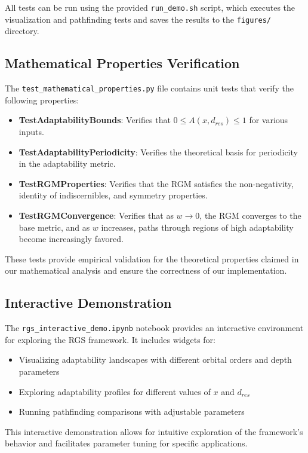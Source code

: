 \documentclass{article}
\begin{document}
All tests can be run using the provided \texttt{run\_demo.sh} script, which executes the visualization and pathfinding tests and saves the results to the \texttt{figures/} directory.

\subsection{Mathematical Properties Verification}
The \texttt{test\_mathematical\_properties.py} file contains unit tests that verify the following properties:

\begin{itemize}
    \item \textbf{TestAdaptabilityBounds}: Verifies that $0 \leq A(x, d_{res}) \leq 1$ for various inputs.
    \item \textbf{TestAdaptabilityPeriodicity}: Verifies the theoretical basis for periodicity in the adaptability metric.
    \item \textbf{TestRGMProperties}: Verifies that the RGM satisfies the non-negativity, identity of indiscernibles, and symmetry properties.
    \item \textbf{TestRGMConvergence}: Verifies that as $w \to 0$, the RGM converges to the base metric, and as $w$ increases, paths through regions of high adaptability become increasingly favored.
\end{itemize}

These tests provide empirical validation for the theoretical properties claimed in our mathematical analysis and ensure the correctness of our implementation.

\subsection{Interactive Demonstration}
The \texttt{rgs\_interactive\_demo.ipynb} notebook provides an interactive environment for exploring the RGS framework. It includes widgets for:

\begin{itemize}
    \item Visualizing adaptability landscapes with different orbital orders and depth parameters
    \item Exploring adaptability profiles for different values of $x$ and $d_{res}$
    \item Running pathfinding comparisons with adjustable parameters
\end{itemize}

This interactive demonstration allows for intuitive exploration of the framework's behavior and facilitates parameter tuning for specific applications.
\end{document}
